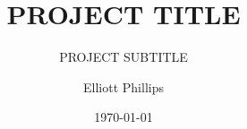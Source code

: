 \title{PROJECT TITLE}
\subtitle{PROJECT SUBTITLE}
\author{Elliott Phillips}
\date{\today}

\frontpage

{ %
	\makeatletter
		\@twosidetrue
		\@openrighttrue
	\makeatother
	
	\ifodd\thepage\relax\else\blankpage\fi
	
	\tableofcontents
	\newpage
	\ifodd\thepage\relax\else\blankpage\fi
	
	
	\setcounter{page}{1}
}

